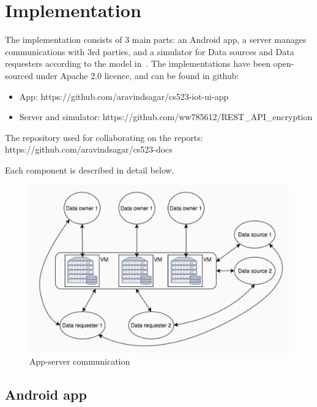 \documentclass[conference]{IEEEtran}
\begin{document}
\section{Implementation}
The implementation consists of 3 main parts: an Android app, a server manages communications with 3rd parties, and a simulator for Data sources and Data requesters according to the model in~\cite{campbell}. The implementations have been open-sourced under Apache 2.0 licence, and can be found in github:
\begin{itemize}
	\item App: https://github.com/\linebreak[0]aravindsagar/\linebreak[0]cs523-iot-ui-app
	\item Server and simulator: https://github.com/\linebreak[0]ww785612/\linebreak[0]REST\_API\_encryption
\end{itemize}

The repository used for collaborating on the reports: https://github.com/\linebreak[0]aravindsagar/\linebreak[0]cs523-docs

Each component is described in detail below.

\begin{figure}[t]
	\includegraphics[width=0.95\linewidth]{app_server.png}
	\caption{App-server communication}
	\label{fig:app_server_comm}
\end{figure}
\subsection{Android app}

\end{document}
